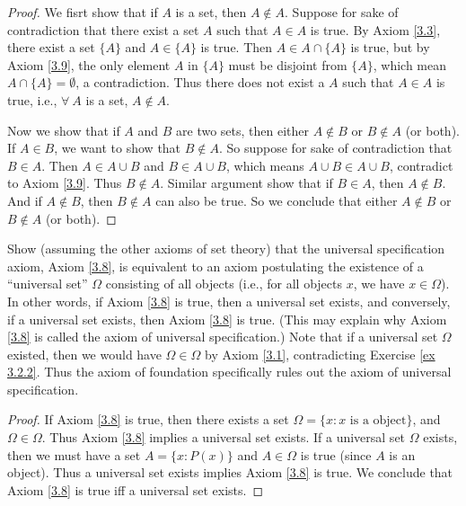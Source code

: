 \begin{proof}
    We fisrt show that if \(A\) is a set, then \(A \notin A\).
    Suppose for sake of contradiction that there exist a set \(A\) such that \(A \in A\) is true.
    By Axiom \ref{3.3}, there exist a set \(\{A\}\) and \(A \in \{A\}\) is true.
    Then \(A \in A \cap \{A\}\) is true, but by Axiom \ref{3.9}, the only element \(A\) in \(\{A\}\) must be disjoint from \(\{A\}\), which mean \(A \cap \{A\} = \emptyset\), a contradiction.
    Thus there does not exist a \(A\) such that \(A \in A\) is true, i.e., \(\forall\ A\) is a set, \(A \notin A\).

    Now we show that if \(A\) and \(B\) are two sets, then either \(A \notin B\) or \(B \notin A\) (or both).
    If \(A \in B\), we want to show that \(B \notin A\).
    So suppose for sake of contradiction that \(B \in A\).
    Then \(A \in A \cup B\) and \(B \in A \cup B\), which means \(A \cup B \in A \cup B\), contradict to Axiom \ref{3.9}.
    Thus \(B \notin A\).
    Similar argument show that if \(B \in A\), then \(A \notin B\).
    And if \(A \notin B\), then \(B \notin A\) can also be true.
    So we conclude that either \(A \notin B\) or \(B \notin A\) (or both).
\end{proof}

\begin{exercise}\label{ex 3.2.3}
    Show (assuming the other axioms of set theory) that the universal specification axiom, Axiom \ref{3.8}, is equivalent to an axiom postulating the existence of a ``universal set'' \(\Omega\) consisting of all objects (i.e., for all objects \(x\), we have \(x \in \Omega\)).
    In other words, if Axiom \ref{3.8} is true, then a universal set exists, and conversely, if a universal set exists, then Axiom \ref{3.8} is true.
    (This may explain why Axiom \ref{3.8} is called the axiom of universal specification.)
    Note that if a universal set \(\Omega\) existed, then we would have \(\Omega \in \Omega\) by Axiom \ref{3.1}, contradicting Exercise \ref{ex 3.2.2}.
    Thus the axiom of foundation specifically rules out the axiom of universal specification.
\end{exercise}

\begin{proof}
    If Axiom \ref{3.8} is true, then there exists a set \(\Omega = \{x: x \text{ is a object}\}\), and \(\Omega \in \Omega\).
    Thus Axiom \ref{3.8} implies a universal set exists.
    If a universal set \(\Omega\) exists, then we must have a set \(A = \{x: P(x)\}\) and \(A \in \Omega\) is true (since \(A\) is an object).
    Thus a universal set exists implies Axiom \ref{3.8} is true.
    We conclude that Axiom \ref{3.8} is true iff a universal set exists.
\end{proof}
